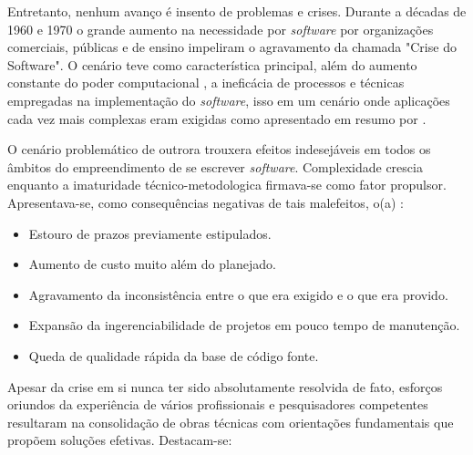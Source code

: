     Entretanto, nenhum avanço é insento de problemas e crises. Durante a décadas de 1960 e
    1970 o grande aumento na necessidade por \textit{software} por organizações comerciais,
    públicas e de ensino impeliram o agravamento da chamada "Crise do Software".
    O cenário teve como característica principal, além do aumento constante do poder
    computacional \cite[~p.3]{dijkstra1972humble}, a ineficácia de processos e técnicas
    empregadas na implementação do \textit{software}, isso em um cenário onde aplicações cada vez
    mais complexas eram exigidas como apresentado em resumo por
    \cite{softwareCrisis2}.

 
    O cenário problemático de outrora trouxera efeitos indesejáveis em todos os âmbitos
    do empreendimento de se escrever \textit{software}. Complexidade crescia enquanto
    a imaturidade técnico-metodologica firmava-se como fator propulsor. Apresentava-se,
    como consequências negativas de tais malefeitos, o(a) :

    \begin{itemize}
      \item{ Estouro de prazos previamente estipulados. }
      \item{ Aumento de custo muito além do planejado. }
      \item{ Agravamento da inconsistência entre o que era exigido e o que era provido. }
      \item{ Expansão da ingerenciabilidade de projetos em pouco tempo de manutenção. }
      \item{ Queda de qualidade rápida da base de código fonte. }
    \end{itemize}

    Apesar da crise em si nunca ter sido absolutamente resolvida de fato, esforços
    oriundos da experiência de vários profissionais e pesquisadores competentes
    resultaram na consolidação de obras técnicas com orientações fundamentais que
    propõem soluções efetivas. Destacam-se: 

